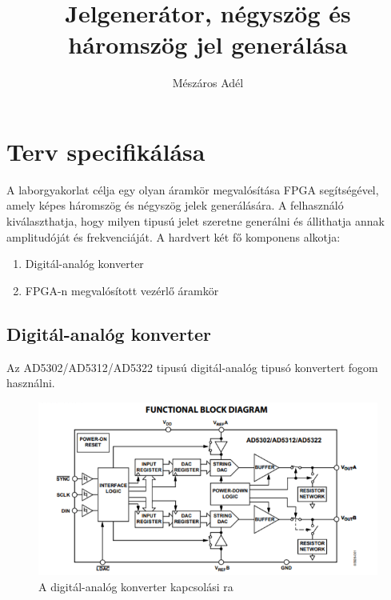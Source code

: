 \documentclass[12pt]{article}
\title{Jelgenerátor, négyszög és háromszög jel generálása}
\author{Mészáros Adél}
\begin{document}
  \maketitle
  \newpage

  \section{Terv specifikálása}
    A laborgyakorlat célja egy olyan áramkör megvalósítása FPGA segítségével, amely képes háromszög és négyszög jelek generálására. A felhasználó kiválaszthatja,
    hogy milyen tipusú jelet szeretne generálni és állithatja annak amplitudóját és frekvenciáját.
    \newline
    A hardvert két fő komponens alkotja: 
    \begin{enumerate}
      \item Digitál-analóg konverter
      \item FPGA-n megvalósított vezérlő áramkör
    \end{enumerate}

    \subsection{Digitál-analóg konverter}
      Az AD5302/AD5312/AD5322 tipusú digitál-analóg tipusó konvertert fogom használni.

      \begin{figure}[h]
        \includegraphics{dac_kapcs}
        \centering
        \caption{A digitál-analóg konverter kapcsolási ra}
      \end{figure}
\end{document}
